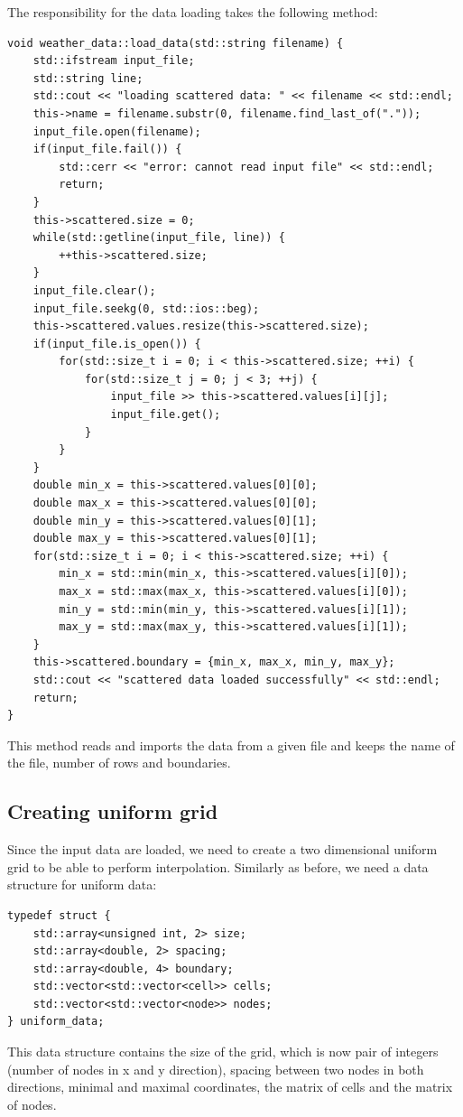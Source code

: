 \documentclass[a4paper, 10pt]{article}
\begin{document}
The responsibility for the data loading takes the following method:
\begin{lstlisting}[caption=method for parsing the data]
void weather_data::load_data(std::string filename) {
	std::ifstream input_file;
	std::string line;
	std::cout << "loading scattered data: " << filename << std::endl;
	this->name = filename.substr(0, filename.find_last_of("."));
	input_file.open(filename);
	if(input_file.fail()) {
		std::cerr << "error: cannot read input file" << std::endl;
		return;
	}
	this->scattered.size = 0;
	while(std::getline(input_file, line)) {
		++this->scattered.size;
	}
	input_file.clear();
	input_file.seekg(0, std::ios::beg);
	this->scattered.values.resize(this->scattered.size);
	if(input_file.is_open()) {
		for(std::size_t i = 0; i < this->scattered.size; ++i) {
			for(std::size_t j = 0; j < 3; ++j) {
				input_file >> this->scattered.values[i][j];
				input_file.get();
			}
		}
	}
	double min_x = this->scattered.values[0][0];
	double max_x = this->scattered.values[0][0];
	double min_y = this->scattered.values[0][1];
	double max_y = this->scattered.values[0][1];
	for(std::size_t i = 0; i < this->scattered.size; ++i) {
		min_x = std::min(min_x, this->scattered.values[i][0]);
		max_x = std::max(max_x, this->scattered.values[i][0]);
		min_y = std::min(min_y, this->scattered.values[i][1]);
		max_y = std::max(max_y, this->scattered.values[i][1]);
	}
	this->scattered.boundary = {min_x, max_x, min_y, max_y};
	std::cout << "scattered data loaded successfully" << std::endl;
	return;
}
\end{lstlisting}
This method reads and imports the data from a given file and keeps the name of the file, number of rows and boundaries. 

\subsection{Creating uniform grid}
Since the input data are loaded, we need to create a two dimensional uniform grid to be able to perform interpolation. Similarly as before, we need a data structure for uniform data:
\begin{lstlisting}[caption=data structure for uniform data]
typedef struct {
	std::array<unsigned int, 2> size;
	std::array<double, 2> spacing;
	std::array<double, 4> boundary;
	std::vector<std::vector<cell>> cells;
	std::vector<std::vector<node>> nodes;
} uniform_data;
\end{lstlisting}
This data structure contains the size of the grid, which is now pair of integers (number of nodes in x and y direction), spacing between two nodes in both directions, minimal and maximal coordinates, the matrix of cells and the matrix of nodes.
\end{document}
